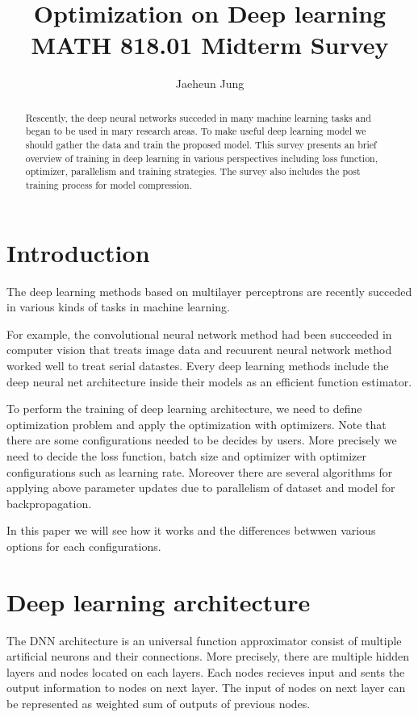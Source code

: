 \documentclass[11pt]{article}
\title{Optimization on Deep learning\\
	\large MATH 818.01 Midterm Survey
}
\author{Jaeheun Jung}
\date{}
\begin{document}
	
	\maketitle
	
	\begin{abstract}
		Rescently, the deep neural networks succeded in many machine learning tasks and began to be used in mary research areas. To make useful deep learning model we should gather the data and train the proposed model. This survey presents an brief overview of training in deep learning in various perspectives including loss function, optimizer, parallelism and training strategies. The survey also includes the post training process for model compression.		
	\end{abstract}
	
	\section{Introduction}\label{section-introduction}
	The deep learning methods based on multilayer perceptrons are recently succeded in various kinds of tasks in machine learning. 
	
	For example, the convolutional neural network method had been succeeded in computer vision that treats image data and recuurent neural network method worked well to treat serial datastes. Every deep learning methods include the deep neural net architecture inside their models as an efficient function estimator.

	To perform the training of deep learning architecture, we need to define optimization problem and apply the optimization with optimizers. Note that there are some configurations needed to be decides by users. More precisely we need to decide the loss function, batch size and optimizer with optimizer configurations such as learning rate. Moreover there are several algorithms for applying above parameter updates due to parallelism of dataset and model for backpropagation.

	In this paper we will see how it works and the differences betwwen various options for each configurations.
	
	
	\section{Deep learning architecture}
	The DNN architecture is an universal function approximator consist of multiple artificial neurons and their connections. More precisely, there are multiple hidden layers and nodes located on each layers. Each nodes recieves input and sents the output information to nodes on next layer. The input of nodes on next layer can be represented as weighted sum of outputs of previous nodes.
\end{document}
